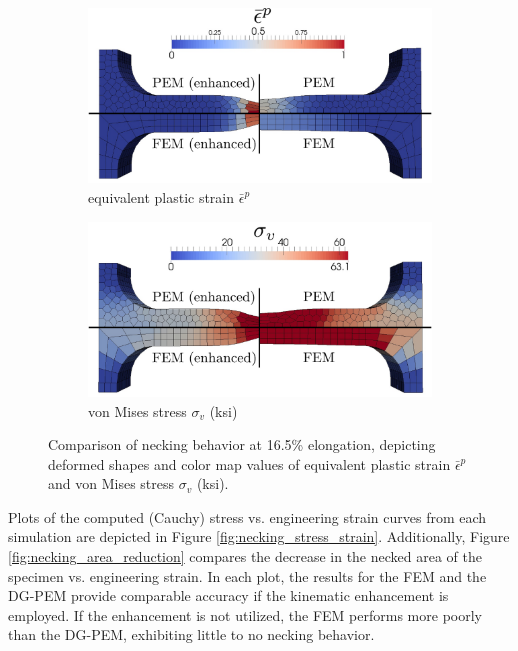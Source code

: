 \begin{figure}[!h]
  \centering
    \begin{subfigure}[b]{1.0\linewidth}
            \centering
            \includegraphics[width=6.0in]{figures/necking_comparison.pdf}
    			\caption{equivalent plastic strain $\bar{\epsilon}^p$ \label{fig:necking_eqps}}
    \end{subfigure}
	\begin{subfigure}[b]{1.0\linewidth}
            \centering
            \includegraphics[width=6.0in]{figures/necking_vonMises.pdf}
    			\caption{von Mises stress $\sigma_v$ (ksi) \label{fig:necking_vonMises}}
    \end{subfigure} \caption{Comparison of necking behavior at 16.5\% elongation, depicting deformed shapes and color map values of equivalent plastic strain $\bar{\epsilon}^p$ and von Mises stress $\sigma_v$ (ksi).}
  \label{fig:necking_comparison}
\end{figure}

Plots of the computed (Cauchy) stress vs. engineering strain curves from each simulation are depicted in Figure \ref{fig:necking_stress_strain}. Additionally, Figure \ref{fig:necking_area_reduction} compares the decrease in the necked area of the specimen vs. engineering strain. In each plot, the results for the FEM and the DG-PEM provide comparable accuracy if the kinematic enhancement is employed. If the enhancement is not utilized, the FEM performs more poorly than the DG-PEM, exhibiting little to no necking behavior.

